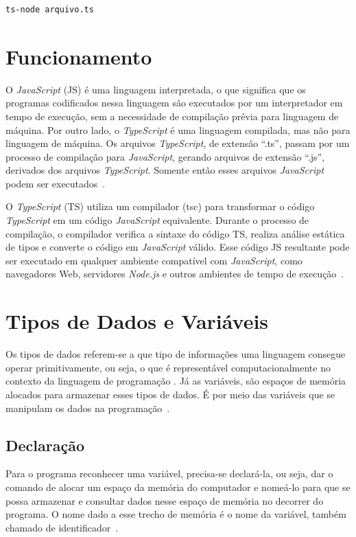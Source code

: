 \begin{lstlisting}[language=bash, label=listing:exec-ts-node, caption=Execução direta de arquivo \textit{TypeScript}.]
ts-node arquivo.ts
\end{lstlisting}

\section{Funcionamento}
\label{JS_funcionamento}

O \textit{JavaScript} (JS) é uma linguagem interpretada, o que significa que os programas codificados nessa linguagem são executados por um interpretador em tempo de execução, sem a necessidade de compilação prévia para linguagem de máquina. Por outro lado, o \textit{TypeScript} é uma linguagem compilada, mas não para linguagem de máquina. Os arquivos \textit{TypeScript}, de extensão ``.ts'', passam por um processo de compilação para \textit{JavaScript}, gerando arquivos de extensão ``.js'', derivados dos arquivos \textit{TypeScript}. Somente então esses arquivos \textit{JavaScript} podem ser executados~\cite{cubos_academy, stxnext}.

O \textit{TypeScript} (TS) utiliza um compilador (tsc) para transformar o código \textit{TypeScript} em um código \textit{JavaScript} equivalente. Durante o processo de compilação, o compilador verifica a sintaxe do código TS, realiza análise estática de tipos e converte o código em \textit{JavaScript} válido. Esse código JS resultante pode ser executado em qualquer ambiente compatível com \textit{JavaScript}, como navegadores Web, servidores \textit{Node.js} e outros ambientes de tempo de execução~\cite{book_progtypescript}. 



\section{Tipos de Dados e Variáveis}
\label{JS_tipoDadosVariaveis}
Os tipos de dados referem-se a que tipo de informações uma linguagem consegue operar primitivamente, ou seja, o que é representável computacionalmente no contexto da linguagem de programação \cite{embarcados, wikipedia_tipodedado}. Já as variáveis, são espaços de memória alocados para armazenar esses tipos de dados. É por meio das variáveis que se manipulam os dados na programação~\cite{gaea, wikipedia_variavel}.

\subsection{Declaração}
Para o programa reconhecer uma variável, precisa-se declará-la, ou seja, dar o comando de alocar um espaço da memória do computador e nomeá-lo para que se possa armazenar e consultar dados nesse espaço de memória no decorrer do programa. O nome dado a esse trecho de memória é o nome da variável, também chamado de identificador~\cite{wikipedia_variavel, gaea}. 

